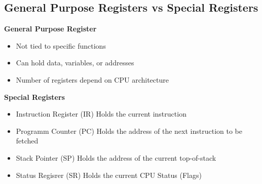\subsection{General Purpose Registers vs Special Registers}
\begin{multicols}{2}
    \begin{minipage}{\linewidth}
        \textbf{General Purpose Register}
        \begin{itemize}
            \item Not tied to specific functions
            \item Can hold data, variables, or addresses
            \item Number of registers depend on CPU architecture
        \end{itemize}
    \end{minipage}
    \begin{minipage}{\linewidth}
        \textbf{Special Registers}
        \begin{itemize}
            \item Instruction Register (IR)
                \subitem Holds the current instruction 
            \item Programm Counter (PC)
                \subitem Holds the address of the next instruction to be fetched
            \item Stack Pointer (SP)
                \subitem Holds the address of the current top-of-stack 
            \item Status Regisrer (SR)
                \subitem Holds the current CPU Status (Flags)
        \end{itemize}
        
    \end{minipage}
\end{multicols}

